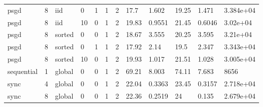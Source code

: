 \begin{tabular}{llllllllllll}
psgd & 8 & iid & 0 & 1 & 1 & 2 & 17.7 & 1.602 & 19.25 & 1.471 & 3.384e+04 \\
psgd & 8 & iid & 10 & 0 & 1 & 2 & 19.83 & 0.9551 & 21.45 & 0.6046 & 3.02e+04 \\
psgd & 8 & sorted & 0 & 0 & 1 & 2 & 18.67 & 3.555 & 20.25 & 3.595 & 3.21e+04 \\
psgd & 8 & sorted & 0 & 1 & 1 & 2 & 17.92 & 2.14 & 19.5 & 2.347 & 3.343e+04 \\
psgd & 8 & sorted & 10 & 0 & 1 & 2 & 19.93 & 1.017 & 21.51 & 1.028 & 3.005e+04 \\
sequential & 1 & global & 0 & 0 & 1 & 2 & 69.21 & 8.003 & 74.11 & 7.683 & 8656 \\
sync & 4 & global & 0 & 0 & 1 & 2 & 22.04 & 0.3363 & 23.45 & 0.3157 & 2.718e+04 \\
sync & 8 & global & 0 & 0 & 1 & 2 & 22.36 & 0.2519 & 24 & 0.135 & 2.679e+04 \\
\hline
\end{tabular}
